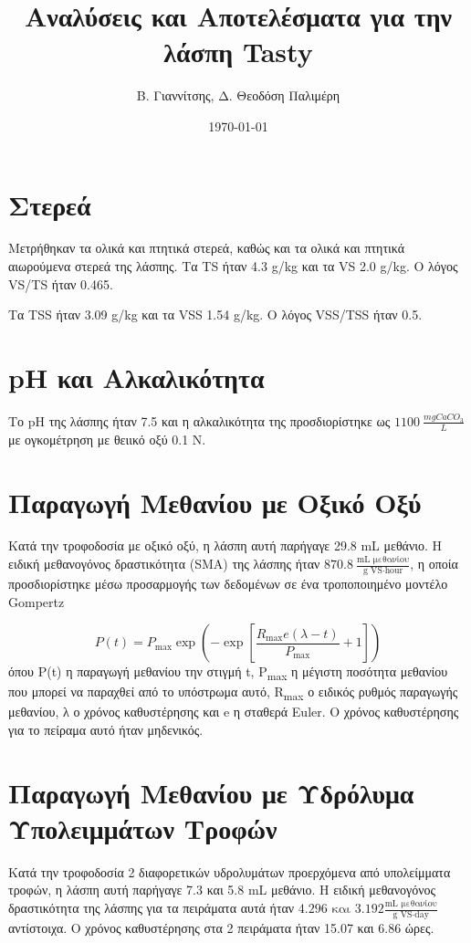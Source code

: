 \documentclass[11pt]{article}
\author{Β. Γιαννίτσης, Δ. Θεοδόση Παλιμέρη}
\date{\today}
\title{Αναλύσεις και Αποτελέσματα για την λάσπη Tasty}
\begin{document}
\maketitle
\tableofcontents


\section{Στερεά}
\label{sec:org324895c}
Μετρήθηκαν τα ολικά και πτητικά στερεά, καθώς και τα ολικά και πτητικά αιωρούμενα στερεά της λάσπης. Τα TS ήταν 4.3 g/kg και τα VS 2.0 g/kg. Ο λόγος VS/TS ήταν 0.465.

Τα TSS ήταν 3.09 g/kg και τα VSS 1.54 g/kg. Ο λόγος VSS/TSS ήταν 0.5.

\section{pH και Αλκαλικότητα}
\label{sec:orgcc009a2}
Το pH της λάσπης ήταν 7.5 και η αλκαλικότητα της προσδιορίστηκε ως \(1100~ \frac{mg CaCO_3}{L}\) με ογκομέτρηση με θειικό οξύ 0.1 N. 

\section{Παραγωγή Μεθανίου με Οξικό Οξύ}
\label{sec:org9c17f5f}
Κατά την τροφοδοσία με οξικό οξύ, η λάσπη αυτή παρήγαγε 29.8 mL μεθάνιο. Η ειδική μεθανογόνος δραστικότητα (SMA) της λάσπης ήταν \(870.8 ~ \frac{\text{mL μεθανίου}}{\text{g VS} \cdot \text{hour}}\), η οποία προσδιορίστηκε μέσω προσαρμογής των δεδομένων σε ένα τροποποιημένο μοντέλο Gompertz

\[ P(t) = P_{\max } \exp \left( - \exp \left[ \frac{R_{\max }e (λ-t)}{P_{\max }} + 1 \right] \right) \]
όπου P(t) η παραγωγή μεθανίου την στιγμή t, P\textsubscript{max} η μέγιστη ποσότητα μεθανίου που μπορεί να παραχθεί από το υπόστρωμα αυτό, R\textsubscript{max} ο ειδικός ρυθμός παραγωγής μεθανίου, λ ο χρόνος καθυστέρησης και e η σταθερά Euler. Ο χρόνος καθυστέρησης για το πείραμα αυτό ήταν μηδενικός.

\section{Παραγωγή Μεθανίου με Υδρόλυμα Υπολειμμάτων Τροφών}
\label{sec:org540be55}
Κατά την τροφοδοσία 2 διαφορετικών υδρολυμάτων προερχόμενα από υπολείμματα τροφών, η λάσπη αυτή παρήγαγε 7.3 και 5.8 mL μεθάνιο. Η ειδική μεθανογόνος δραστικότητα της λάσπης για τα πειράματα αυτά ήταν \(4.296 \text{ και } 3.192 \frac{\text{mL μεθανίου}}{\text{g VS} \cdot \text{day}}\) αντίστοιχα. Ο χρόνος καθυστέρησης στα 2 πειράματα ήταν 15.07 και 6.86 ώρες.
\end{document}
